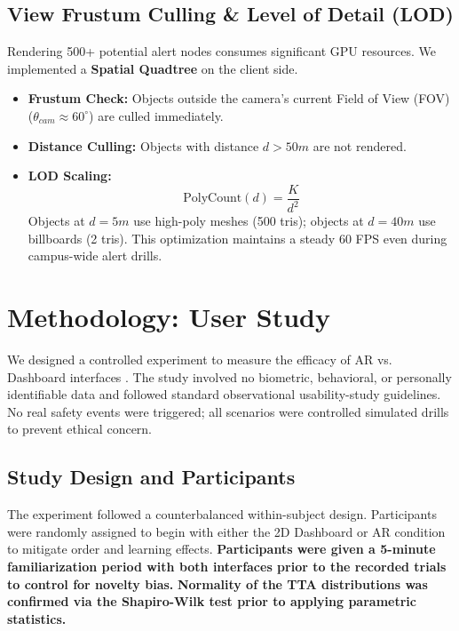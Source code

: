 \documentclass[conference]{IEEEtran}
\begin{document}
\subsection{View Frustum Culling \& Level of Detail (LOD)}
Rendering 500+ potential alert nodes consumes significant GPU resources. We implemented a \textbf{Spatial Quadtree} on the client side.
\begin{itemize}
    \item \textbf{Frustum Check:} Objects outside the camera's current Field of View (FOV) ($ \theta_{cam} \approx 60^\circ $) are culled immediately.
    \item \textbf{Distance Culling:} Objects with distance $d > 50m$ are not rendered.
    \item \textbf{LOD Scaling:}
    \begin{equation}
    \text{PolyCount}(d) = \frac{K}{d^2}
    \end{equation}
    Objects at $d=5m$ use high-poly meshes (500 tris); objects at $d=40m$ use billboards (2 tris). This optimization maintains a steady 60 FPS even during campus-wide alert drills.
\end{itemize}

\section{Methodology: User Study}

We designed a controlled experiment to measure the efficacy of AR vs. Dashboard interfaces \cite{b9}. The study involved no biometric, behavioral, or personally identifiable data and followed standard observational usability-study guidelines. No real safety events were triggered; all scenarios were controlled simulated drills to prevent ethical concern.

\subsection{Study Design and Participants}
The experiment followed a counterbalanced within-subject design. Participants were randomly assigned to begin with either the 2D Dashboard or AR condition to mitigate order and learning effects. \textbf{Participants were given a 5-minute familiarization period with both interfaces prior to the recorded trials to control for novelty bias.} \textbf{Normality of the TTA distributions was confirmed via the Shapiro-Wilk test prior to applying parametric statistics.}
\end{document}
